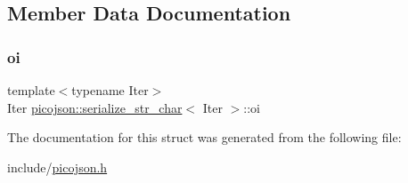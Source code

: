 \subsection{Member Data Documentation}
\hypertarget{structpicojson_1_1serialize__str__char_a1abb88801c571a903ef9e3a21388b944}{}\label{structpicojson_1_1serialize__str__char_a1abb88801c571a903ef9e3a21388b944} 
\subsubsection{\texorpdfstring{oi}{oi}}
{\footnotesize\ttfamily template$<$typename Iter$>$ \\
Iter \hyperlink{structpicojson_1_1serialize__str__char}{picojson\+::serialize\+\_\+str\+\_\+char}$<$ Iter $>$\+::oi}



The documentation for this struct was generated from the following file\+:\begin{DoxyCompactItemize}
\item 
include/\hyperlink{picojson_8h}{picojson.\+h}\end{DoxyCompactItemize}
